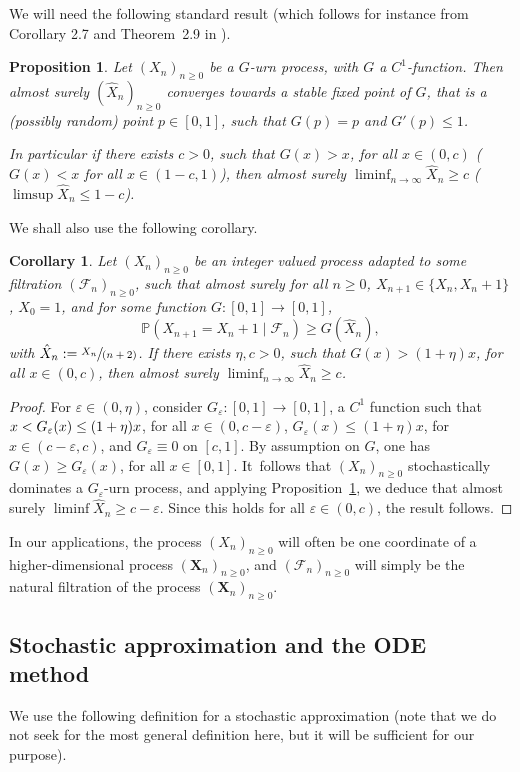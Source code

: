 \documentclass[JEP,XML,SOM,Unicode,NoFloatCountersInSection,published]{cedram}
\let\mathcal\mathscr
\newcommand{\spfrac}[2]{\sfrac{#1}{(#2)}}
\newcommand{\bX}{\boldsymbol{X}}
\numberwithin{equation}{section}
\newtheorem{corollary}[theorem]{Corollary}
\newtheorem{proposition}[theorem]{Proposition}
\theoremstyle{definition}
\begin{document}
We will need the following standard result (which follows for instance from Corollary 2.7 and Theorem~2.9 in \cite{Pemantle}).
\begin{proposition}\label{lem.urne}
Let $(X_n)_{n\ge 0}$ be a $G$-urn process, with $G$ a $C^1$-function. Then almost surely $(\hat X_n)_{n\ge 0}$ converges towards a stable fixed point
of $G$, that is a (possibly random) point $p\in [0,1]$, such that $G(p)= p$ and $G'(p)\le 1$.

In particular if there exists $c>0$, such that $G(x)>x$, for all $x\in (0,c)$ (\resp $G(x)<x$ for all $x\in (1-c,1)$),
then almost surely $\liminf_{n\to \infty} {\hat X_n}\ge c$ (\resp $\limsup {\hat X_n} \le 1-c$).
\end{proposition}
We shall also use the following corollary.
\begin{corollary}\label{prop.urne}
Let $(X_n)_{n\ge 0}$ be an integer valued process adapted to some filtration $(\mathcal F_n)_{n\ge 0}$, such that almost surely for all $n\ge 0$, $X_{n+1} \in \{X_n,X_n+1\}$, $X_0=1$, and for some function $G:[0,1]\to [0,1]$,
\begin{equation}\label{Gurn.dom}
\mathbb P(X_{n+1} = X_n +1 \mid \mathcal F_n) \ge G(\hat X_n),
\end{equation}
with $\hat X_n :=\spfrac{X_n}{n+2}$.
If there exists $\eta, c>0$, such that $G(x) > (1+\eta)x$, for all $x\in (0,c)$,
then almost surely $\liminf_{n\to \infty} {\hat X_n} \ge c$.
\end{corollary}
\begin{proof} For $\varepsilon \in (0,\eta)$, consider $G_\varepsilon:[0,1] \to [0,1]$, a $C^1$ function such that
$x <\nobreak G_\varepsilon(x) \le (1+\eta)x$, for all $x\in (0,c-\varepsilon)$, $G_\varepsilon(x) \le (1+\eta)x$, for $x\in (c-\varepsilon,c)$, and $G_\varepsilon \equiv 0$ on $[c,1]$. By assumption on $G$,
one has $G(x) \ge G_\varepsilon(x)$, for all $x\in [0,1]$. It~follows that $(X_n)_{n\ge 0}$ stochastically dominates a $G_\varepsilon$-urn process, and
applying {Proposition}~\ref{lem.urne}, we deduce that almost surely $\liminf \hat X_n \ge c-\varepsilon$.
Since this holds for all $\varepsilon \in (0,c)$, the result follows.
\end{proof}
In our applications, the process $(X_n)_{n\ge 0}$ will often be one coordinate of a higher-dimensional process $(\bX_n)_{n\ge 0}$, and
$(\mathcal F_n)_{n\ge 0}$ will simply be the natural filtration of the process $(\bX_n)_{n\ge 0}$.

\subsection{Stochastic approximation and the ODE method}\label{sec.stoch.approx}
We use the following definition for a stochastic approximation (note that we do not seek for the most general definition here, but it will be sufficient for our purpose).
\end{document}
